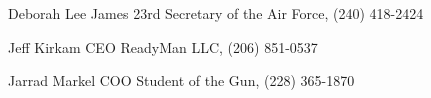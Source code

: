 



\begin{cvhonors}

  \cvhonor
    {Deborah Lee James} %
    {23rd Secretary of the Air Force, (240) 418-2424} %
    {} %
    {} %

\cvhonor
{Jeff Kirkam} %
{CEO ReadyMan LLC, (206) 851-0537} %
{} %
{} %

\cvhonor
{Jarrad Markel} %
{COO Student of the Gun, (228) 365-1870} %
{} %
{} %

\end{cvhonors}








